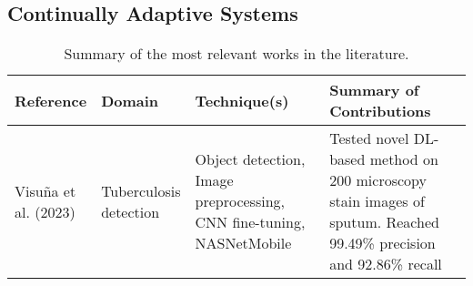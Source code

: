 \documentclass[../main.tex]{subfiles}
\begin{document}
    \subsection{Continually Adaptive Systems} \label{sec:continually_adaptive_systems_sota}

    
    \begin{table}[p]
        \caption{Summary of the most relevant works in the literature.}
        \label{tab:sota_summary}
        \hspace*{-1.5cm}
        \begin{tabular}{
            p{0.14\linewidth} | p{0.13\linewidth} | p{0.35\linewidth} | p{0.5\linewidth} 
        }
        \toprule
        \textbf{Reference} & \textbf{Domain} &\textbf{Technique(s)} & \textbf{Summary of Contributions} \\
        \midrule
        Visuña et al. (2023) \cite{visuna_novel_2023} & Tuberculosis detection & Object detection, Image preprocessing, CNN fine-tuning, NASNetMobile & Tested novel DL-based method on 200 microscopy stain images of sputum. Reached  99.49\% precision and 92.86\% recall \\
        \bottomrule
        \end{tabular}
    \end{table}

    
    
    
\end{document}
